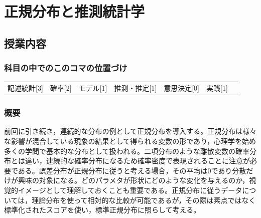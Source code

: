 \section{正規分布と推測統計学}
\label{D1_lesson08}

\subsection{授業内容}
\subsubsection{科目の中でのこのコマの位置づけ}
\begin{tabular}[t]{ccccccc}
    記述統計[3] & 確率[2] & モデル[1] & 推測・推定[1] & 意思決定[0] & 実践[1]
\end{tabular}

\subsubsection{概要}
前回に引き続き，連続的な分布の例として正規分布を導入する。正規分布は様々な影響が混合している現象の結果として得られる変数の形であり，心理学を始め多くの学問で基本的な分布として扱われる。二項分布のような離散変数の確率分布とは違い，連続的な確率分布になるため確率密度で表現されることに注意が必要である。誤差分布が正規分布に従うと考える場合，その平均は0であり分散だけが興味の対象になる。どのパラメタが形状にどのような変化を与えるのか，視覚的イメージとして理解しておくことも重要である。正規分布に従うデータについては，理論分布を使って相対的な比較が可能であるが，その際は素点ではなく標準化されたスコアを使い，標準正規分布に照らして考える。
